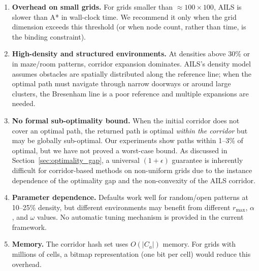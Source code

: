 \documentclass[journal]{IEEEtran}
\begin{document}
\begin{enumerate}
    \item \textbf{Overhead on small grids.}
    For grids smaller than ${\approx}100{\times}100$, AILS is slower than A* in wall-clock time.
    We recommend it only when the grid dimension exceeds this threshold (or when node count, rather than time, is the binding constraint).

    \item \textbf{High-density and structured environments.}
    At densities above 30\% or in maze/room patterns, corridor expansion dominates.
    AILS's density model assumes obstacles are spatially distributed along the reference line; when the optimal path must navigate through narrow doorways or around large clusters, the Bresenham line is a poor reference and multiple expansions are needed.

    \item \textbf{No formal sub-optimality bound.}
    When the initial corridor does not cover an optimal path, the returned path is optimal \emph{within the corridor} but may be globally sub-optimal.
    Our experiments show paths within 1--3\% of optimal, but we have not proved a worst-case bound.
    As discussed in Section~\ref{sec:optimality_gap}, a universal $(1{+}\epsilon)$ guarantee is inherently difficult for corridor-based methods on non-uniform grids due to the instance dependence of the optimality gap and the non-convexity of the AILS corridor.

    \item \textbf{Parameter dependence.}
    Defaults work well for random/open patterns at 10--25\% density, but different environments may benefit from different $r_{\max}$, $\alpha$, and $\omega$ values.
    No automatic tuning mechanism is provided in the current framework.

    \item \textbf{Memory.}
    The corridor hash set uses $O(|C_a|)$ memory.
    For grids with millions of cells, a bitmap representation (one bit per cell) would reduce this overhead.


\end{enumerate}
\end{document}
